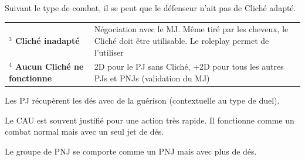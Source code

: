 \begin{frame}[t]
{\vspace{0.2cm}

Suivant le type de combat, il se peut que le défenseur n'ait pas de Cliché adapté.

\vspace{0.2cm}

\begin{tabular}{p{2.5cm}p{5.6cm}}
\textbf{$^{3}$ Cliché inadapté} & Négociation avec le MJ. Même tiré par les cheveux, le Cliché doit être utilisable. Le roleplay permet de l'utiliser \\
\textbf{$^{4}$ Aucun Cliché ne fonctionne} & 2D pour le PJ sans Cliché, +2D pour tous les autres PJs et PNJs (validation du MJ)  \\ 
\end{tabular}

\vspace{0.2cm}


Les PJ récupèrent les dés avec de la guérison (contextuelle au type de duel).


Le CAU est souvent justifié pour une action très rapide. Il fonctionne comme un combat normal mais avec un seul jet de dés.



Le groupe de PNJ se comporte comme un PNJ mais avec plus de dés.


\vspace{0.2cm}

}
\end{frame}
